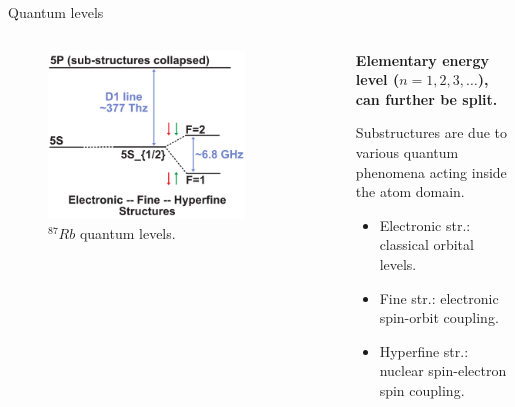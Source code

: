 \begin{frame}{Quantum levels}

    \begin{columns}[c, onlytextwidth]

        \begin{column}{0.45\textwidth}

            \begin{figure}
                \centering
                \includegraphics[width=0.8\textwidth]{pdf/Rubidium-hyperfine-levels.pdf}
                \caption{$^{87}Rb$ quantum levels.}
            \end{figure}

        \end{column}

        \begin{column}{0.55\textwidth}

            \textbf{Elementary energy level ($n=1,2,3,\ldots$), can further be split.\footnotemark[1]}

            \vspace{10pt}

            Substructures are due to various quantum phenomena acting inside the atom domain.

            \begin{itemize}
                \item Electronic str.: classical orbital levels.
                \item Fine str.: electronic spin-orbit coupling.
                \item Hyperfine str.: \textcolor[HTML]{FF0000}{nuclear spin}-\textcolor[HTML]{00ED00}{electron spin} coupling.
            \end{itemize}

        \end{column}

    \end{columns}

    \vspace{10pt}


\end{frame}




